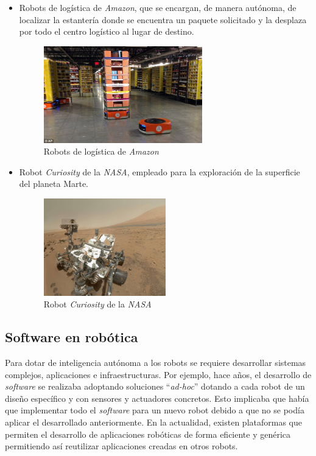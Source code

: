 \begin{itemize}
    \item Robots de logística de \textit{Amazon}, que se encargan, de manera autónoma, de localizar la estantería donde se encuentra un paquete solicitado y la desplaza por todo el centro logístico al lugar de destino. 
        \begin{figure}[H]
    \centering
    \includegraphics[width=0.65\textwidth]{img/robots-amazon.jpg}
    \caption{Robots de logística de \textit{Amazon}} \label{fig:amazon}
    \end{figure}
    \item Robot \textit{Curiosity} de la \textit{NASA}, empleado para la exploración de la superficie del planeta Marte. 
    \begin{figure}[H]
    \centering
    \includegraphics[width=0.5\textwidth]{img/curiosity.jpg}
    \caption{Robot \textit{Curiosity} de la \textit{NASA}} \label{fig:curiosity}
    \end{figure}
\end{itemize}{}

\subsection{Software en robótica}
\label{subsec:softwarerobot}
Para dotar de inteligencia autónoma a los robots se requiere desarrollar sistemas  complejos, aplicaciones e infraestructuras. Por ejemplo, hace años, el desarrollo de \textit{software} se realizaba adoptando soluciones ``\textit{ad-hoc}'' dotando a cada robot de un diseño específico y con sensores y actuadores concretos. Esto implicaba que había que implementar todo el \textit{software} para un nuevo robot debido a que no se podía aplicar el desarrollado anteriormente. En la actualidad, existen plataformas que permiten el desarrollo de aplicaciones robóticas de forma eficiente y genérica permitiendo así reutilizar aplicaciones creadas en otros robots. \\  


